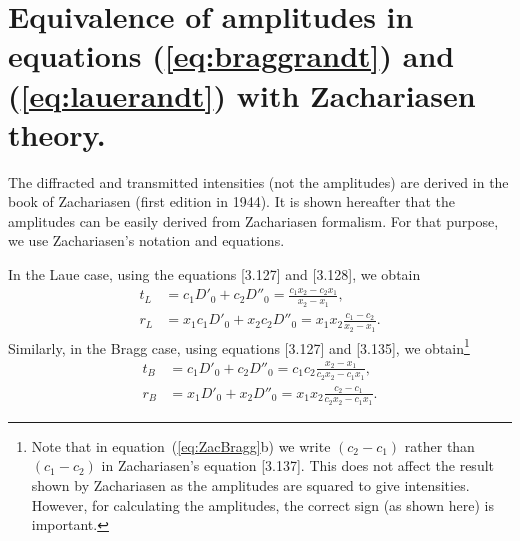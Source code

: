 \documentclass[preprint]{iucr}              %
\begin{document}
\section{Equivalence of amplitudes in equations (\ref{eq:braggrandt}) and (\ref{eq:lauerandt}) with Zachariasen theory.}
\label{appendix:zachariasen}

The diffracted and transmitted intensities (not the amplitudes) are derived in the book of Zachariasen \cite{ZachariasenBook} (first edition in 1944). It is shown hereafter that the amplitudes can be easily derived from Zachariasen formalism. For that purpose, we use Zachariasen's notation and equations. 

In the Laue case, using the equations [3.127] and [3.128], we obtain
 	\begin{subequations}
    \label{eq:ZacLaue}
    \begin{align}
    t_L &= c_1 D'_0 + c_2 D''_0 = \frac{c_1 x_2 - c_2 x_1}{x_2-x_1},\\
    r_L &= x_1 c_1 D'_0 + x_2 c_2 D''_0 = x_1 x_2 \frac{c_1 - c_2}{x_2-x_1}.
    \end{align}
	\end{subequations}
Similarly, in the Bragg case, using equations [3.127] and [3.135], we obtain\footnote{Note that in equation~(\ref{eq:ZacBragg}b) we write $(c_2-c_1)$ rather than $(c_1-c_2)$ in Zachariasen's equation [3.137]. This does not affect the result shown by Zachariasen as the amplitudes are squared to give intensities. However, for calculating the amplitudes, the correct sign (as shown here) is important.}
 	\begin{subequations}
    \label{eq:ZacBragg}
    \begin{align}
    t_B &= c_1 D'_0 + c_2 D''_0 = c_1 c_2 \frac{x_2 - x_1}{c_2 x_2-c_1 x_1},\\
    r_B &= x_1 D'_0 + x_2 D''_0 = x_1 x_2 \frac{c_2 - c_1}{c_2 x_2-c_1 x_1}.
    \end{align}
	\end{subequations}


\end{document}
